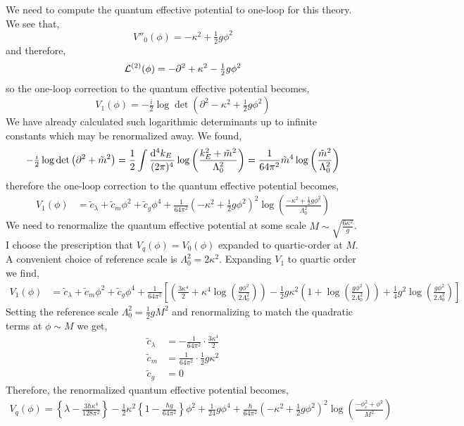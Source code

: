 \documentclass[12pt]{article}
\begin{document}
We need to compute the quantum effective potential to one-loop for this theory. We see that,
\[ V''_0(\phi) = - \kappa^2 + \tfrac{1}{2} g \phi^2 \]
and therefore,
\[ \mathcal{L}^{(2)}(\phi) = - \partial^2 + \kappa^2 - \tfrac{1}{2} g \phi^2 \]  
so the one-loop correction to the quantum effective potential becomes,
\[ V_1(\phi) = -\tfrac{i}{2} \log{\det{\left( \partial^2 - \kappa^2 + \tfrac{1}{2} g \phi^2 \right)}} \]
We have already calculated such logarithmic determinants up to infinite constants which may be renormalized away. We found,
\[ -\tfrac{i}{2} \log{\det{\left(\partial^2 + \tilde{m}^2 \right)}} = \frac{1}{2} \int \frac{\mathrm{d}^{4} k_E \:}{(2\pi)^4} \log{\left( \frac{k_E^2 + \tilde{m}^2}{\Lambda_0^2} \right)}  = \frac{1}{64 \pi^2} \tilde{m}^4 \log{\left( \frac{\tilde{m}^2}{\Lambda_0^2}  \right)}  \]
therefore the one-loop correction to the quantum effective potential becomes,
\begin{align*}
V_1(\phi) & = \tilde{c}_{\lambda} + \tilde{c}_m \phi^2 + \tilde{c}_g \phi^4 + \frac{1}{64 \pi^2} \left(- \kappa^2 + \tfrac{1}{2} g \phi^2 \right)^2 \log{\left( \frac{- \kappa^2 + \tfrac{1}{2} g \phi^2}{\Lambda_0^2} \right)} 
\end{align*}
We need to renormalize the quantum effective potential at some scale $M \sim \sqrt{\frac{6 \kappa^2}{g}}$. 
I choose the prescription that $V_q(\phi) = V_0(\phi)$ expanded to quartic-order at $M$. A convenient choice of reference scale is $\Lambda_0^2 = 2 \kappa^2$. Expanding $V_1$ to quartic order we find,
\begin{align*}
V_1(\phi) & = \tilde{c}_{\lambda} + \tilde{c}_m \phi^2 + \tilde{c}_g \phi^4 + \frac{1}{64 \pi^2} \left[ \left( \frac{3 \kappa^4}{2} + \kappa^4 \log{\left( \frac{g \phi^2}{2\Lambda_0^2} \right)} \right)
 -\frac{1}{2} g \kappa^2 \left( 1 + \log{\left( \frac{g \phi^2}{2 \Lambda_0^2} \right)} \right) 
 + \frac{1}{4} g^2 \log{\left( \frac{g \phi^2}{2 \Lambda_0^2} \right)} \right]
\end{align*}
Setting the reference scale $\Lambda_0^2 = \tfrac{1}{2} g M^2$ and renormalizing to match the quadratic terms at $\phi \sim M$ we get,
\begin{align*}
\tilde{c}_{\lambda} & = - \frac{1}{64\pi^2} \cdot  \frac{3 \kappa^4}{2} 
\\
\tilde{c}_{m} & = \frac{1}{64\pi^2} \cdot \frac{1}{2} g \kappa^2
\\
\tilde{c}_g & = 0
\end{align*}
Therefore, the renormalized quantum effective potential becomes,
\begin{align*}
V_q(\phi) = \left\{ \lambda - \frac{3 \hbar \kappa^4}{128 \pi^2} \right\} - \frac{1}{2} \kappa^2 \left\{ 1 - \frac{\hbar g}{64 \pi^2} \right\} \phi^2 + \frac{1}{24} g \phi^4 + \frac{\hbar}{64 \pi^2} \left(- \kappa^2 + \tfrac{1}{2} g \phi^2 \right)^2 \log{\left( \frac{- \phi_c^2 + \phi^2}{M^2} \right)} 
\end{align*}
\end{document}
